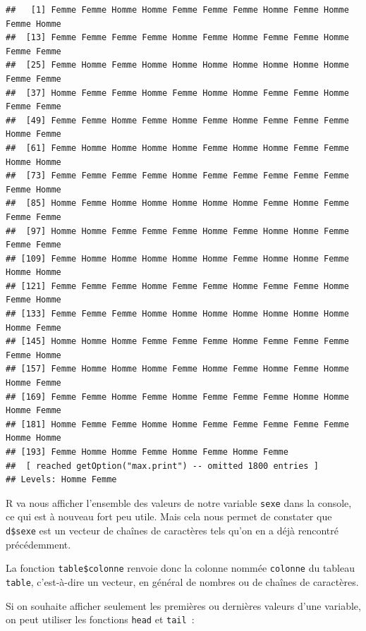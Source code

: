 \documentclass[12pt,]{book}
\newenvironment{Shaded}{\begin{snugshade}}{\end{snugshade}}
\newcommand{\KeywordTok}[1]{\textcolor[rgb]{0.27,0.27,0.27}{\textbf{#1}}}
\newcommand{\NormalTok}[1]{#1}
\newcommand{\OperatorTok}[1]{\textcolor[rgb]{0.43,0.43,0.43}{\textbf{#1}}}
\begin{document}
\begin{verbatim}
##   [1] Femme Femme Homme Homme Femme Femme Femme Homme Femme Homme Femme Homme
##  [13] Femme Femme Femme Femme Homme Femme Homme Femme Femme Homme Femme Femme
##  [25] Femme Homme Femme Homme Homme Homme Homme Homme Homme Homme Femme Femme
##  [37] Homme Femme Femme Homme Femme Homme Homme Femme Femme Homme Femme Femme
##  [49] Femme Femme Homme Femme Homme Femme Homme Femme Femme Femme Homme Femme
##  [61] Femme Homme Homme Homme Homme Femme Homme Homme Femme Femme Homme Homme
##  [73] Femme Femme Femme Femme Homme Femme Femme Femme Femme Femme Femme Homme
##  [85] Homme Femme Homme Homme Homme Homme Homme Femme Homme Femme Femme Femme
##  [97] Homme Homme Femme Femme Femme Homme Femme Homme Homme Femme Femme Femme
## [109] Femme Homme Homme Homme Homme Homme Femme Homme Homme Femme Homme Homme
## [121] Femme Femme Femme Homme Femme Femme Homme Femme Femme Homme Femme Homme
## [133] Femme Femme Femme Homme Homme Homme Homme Homme Homme Homme Homme Femme
## [145] Homme Homme Homme Femme Femme Femme Homme Femme Femme Femme Femme Homme
## [157] Femme Homme Homme Homme Femme Homme Femme Homme Femme Homme Homme Femme
## [169] Femme Femme Homme Femme Homme Femme Femme Femme Homme Homme Homme Femme
## [181] Homme Femme Femme Homme Homme Femme Femme Femme Femme Femme Homme Homme
## [193] Femme Homme Homme Femme Homme Femme Homme Femme
##  [ reached getOption("max.print") -- omitted 1800 entries ]
## Levels: Homme Femme
\end{verbatim}

R va nous afficher l'ensemble des valeurs de notre variable \texttt{sexe} dans la console, ce qui est à nouveau fort peu utile. Mais cela nous permet de constater que \texttt{d\$sexe} est un vecteur de chaînes de caractères tels qu'on en a déjà rencontré précédemment.

La fonction \texttt{table\$colonne} renvoie donc la colonne nommée \texttt{colonne} du tableau \texttt{table}, c'est-à-dire un vecteur, en général de nombres ou de chaînes de caractères.

Si on souhaite afficher seulement les premières ou dernières valeurs d'une variable, on peut utiliser les fonctions \texttt{head} et \texttt{tail}~:

\begin{Shaded}
\end{Shaded}
\end{document}
